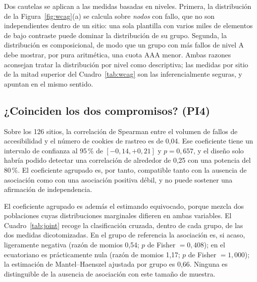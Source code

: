 \documentclass[pdflatex,sn-basic,Numbered]{sn-jnl}
\theoremstyle{thmstyleone}
\theoremstyle{thmstyletwo}
\theoremstyle{thmstylethree}
\begin{document}
Dos cautelas se aplican a las medidas basadas en niveles. Primera, la distribuci\'on de la Figura~\ref{fig:wcag}(a) se calcula sobre \emph{nodos} con fallo, que no son independientes dentro de un sitio: una sola plantilla con varios miles de elementos de bajo contraste puede dominar la distribuci\'on de su grupo. Segunda, la distribuci\'on es composicional, de modo que un grupo con m\'as fallos de nivel A debe mostrar, por pura aritm\'etica, una cuota AAA menor. Ambas razones aconsejan tratar la distribuci\'on por nivel como descriptiva; las medidas por sitio de la mitad superior del Cuadro~\ref{tab:wcag} son las inferencialmente seguras, y apuntan en el mismo sentido.

\subsection{¿Coinciden los dos compromisos? (PI4)}\label{sec:results-joint}

Sobre los 126 sitios, la correlaci\'on de Spearman entre el volumen de fallos de accesibilidad y el n\'umero de cookies de rastreo es de 0,04. Ese coeficiente tiene un intervalo de confianza al 95\,\% de $[-0{,}14, +0{,}21]$ y $p=0{,}657$, y el dise\~no solo habr\'ia podido detectar una correlaci\'on de alrededor de 0,25 con una potencia del 80\,\%. El coeficiente agrupado es, por tanto, compatible tanto con la ausencia de asociaci\'on como con una asociaci\'on positiva d\'ebil, y no puede sostener una afirmaci\'on de independencia.

El coeficiente agrupado es adem\'as el estimando equivocado, porque mezcla dos poblaciones cuyas distribuciones marginales difieren en ambas variables. El Cuadro~\ref{tab:joint} recoge la clasificaci\'on cruzada, dentro de cada grupo, de las dos medidas dicotomizadas. En el grupo de referencia la asociaci\'on es, si acaso, ligeramente negativa (raz\'on de momios 0,54; $p$ de Fisher $=0{,}408$); en el ecuatoriano es pr\'acticamente nula (raz\'on de momios 1,17; $p$ de Fisher $=1{,}000$); la estimaci\'on de Mantel--Haenszel ajustada por grupo es 0,66. Ninguna es distinguible de la ausencia de asociaci\'on con este tama\~no de muestra.
\end{document}
